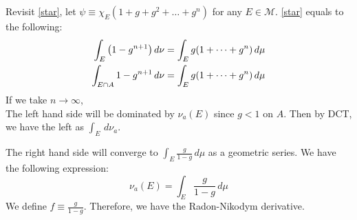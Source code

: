 \begin{prf}
Revisit \eqref{star}, let $\psi \equiv \chi_E(1+g+g^2+\dots + g^n)$ for any $E\in \mathcal M$. \eqref{star} equals to the following:  
\begin{align*}
	\int_E\qty(1-g^{n+1})\, d\nu &= \int_E g\qty(1+\dots + g^n)\, d\mu\\
	\int_{E\cap A} 1-g^{n+1}\, d\nu &= \int_E  g\qty(1+\dots + g^n)\, d\mu
\end{align*}
If we take $n\to \infty$, \\

The left hand side will be dominated by $\nu_a(E)$ since $g<1$ on $A$. Then by DCT, we have the left as $\int_E \, d\nu_a$. 

The right hand side will converge to $\int_E \frac{g}{1-g}\, d\mu$ as a geometric series. We have the following expression: 
$$\nu_a(E) = \int_E \frac{g}{1-g} \, d\mu$$
We define $f\equiv \frac{g}{1-g}$. Therefore, we have the Radon-Nikodym derivative. 

\end{prf}


% 


 
 
 


